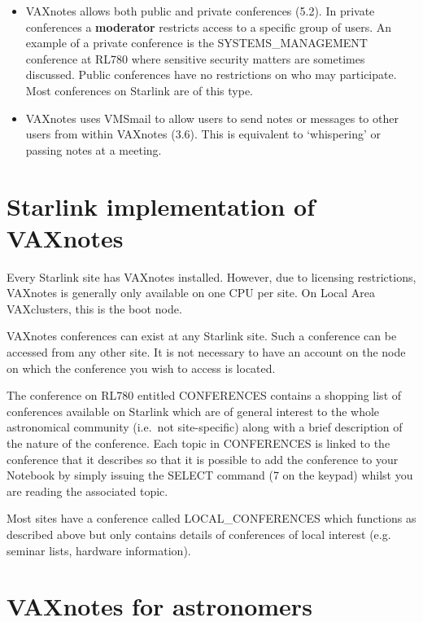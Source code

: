 \begin{itemize}
\item  VAXnotes allows both public and private conferences (5.2). In private
conferences a {\bf moderator} restricts access to a specific group
of users. An example of a private conference is the SYSTEMS\_MANAGEMENT
conference at RL780 where sensitive security matters are sometimes
discussed. Public conferences have no restrictions on who may participate.
Most conferences on Starlink are of this type.

\item VAXnotes uses VMSmail to allow users to send notes or messages to
other users from within VAXnotes (3.6). This is equivalent to `whispering'
or passing notes at a meeting.

\end{itemize}

\section {Starlink implementation of VAXnotes}

Every Starlink site has VAXnotes installed. However, due to licensing
restrictions, VAXnotes is generally only available on one CPU per site.
On Local Area VAXclusters, this is the boot node.

VAXnotes conferences can exist at any Starlink site. Such a
conference can be accessed from any other site. It is not necessary
to have an account on the node on which the conference you wish to
access is located.

The conference on RL780 entitled CONFERENCES contains a shopping list of
conferences available on Starlink which are of general interest to
the whole astronomical community (i.e.\ not site-specific) along
with a brief description of the nature of the conference. Each topic
in CONFERENCES is linked to the conference that it describes
so that it is possible to add the conference to your Notebook
by simply issuing the SELECT command (7 on the keypad) whilst
you are reading the associated topic.

Most sites have a conference called LOCAL\_CONFERENCES which functions as
described above but only contains details of conferences of local interest
(e.g. seminar lists, hardware information).



\section {VAXnotes for astronomers}

